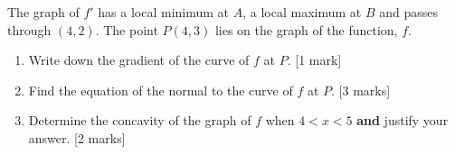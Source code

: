 \documentclass[12pt, twoside]{article}
\begin{document}
\begin{enumerate}
  The graph of $f'$ has a local minimum at $A$, a local maximum at $B$ and passes through $(4,2)$. The point $P(4,3)$ lies on the graph of the function, $f$.
  \begin{enumerate}
    \item Write down the gradient of the curve of $f$ at $P$. [1 mark]
    \item Find the equation of the normal to the curve of $f$ at $P$. [3 marks]
    \item Determine the concavity of the graph of $f$ when $4<x<5$ \textbf{and} justify your answer. [2 marks]
  \end{enumerate}


\end{enumerate}
\end{document}
